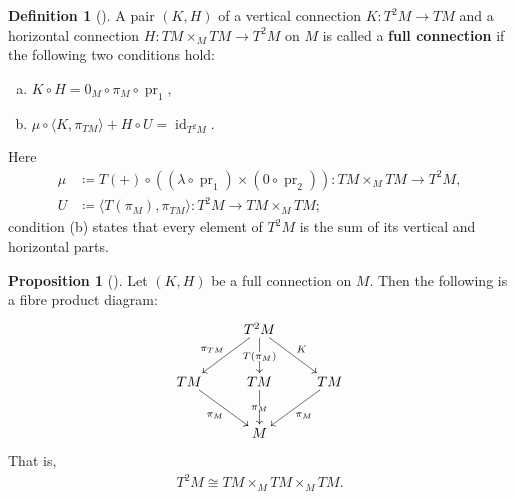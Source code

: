 \documentclass{amsart}
\DeclareMathOperator{\pr}{pr}
\DeclareMathOperator{\id}{id}
\theoremstyle{definition}
\newtheorem{defn}[thm]{Definition}
\newtheorem{prop}[thm]{Proposition}
\begin{document}
\begin{defn}[{\cite[Definition~5.2]{CC17}}]\label{def:full-connection}
A pair $(K, H)$ of a vertical connection $K \colon T^2M \to TM$ and a horizontal
connection $H \colon TM \times_M TM \to T^2M$ on $M$
is called a \textbf{full connection} if the
following two conditions hold:
\begin{enumerate}[(a)]
    \item $K \circ H = 0_M \circ \pi_M \circ \pr_1$,
    \item $\mu \circ \langle K, \pi_{TM} \rangle + H \circ U = \id_{T^2M}$.
\end{enumerate}
Here
\begin{align*}
  \mu &\coloneqq T({+}) \circ ((\lambda \circ \pr_1) \times (0 \circ \pr_2))
    \colon TM \times_M TM \to T^2M, \\
  U &\coloneqq \langle T(\pi_M), \pi_{TM} \rangle
    \colon T^2M \to TM \times_M TM;
\end{align*}
condition (b) states that every element of $T^2M$ is the sum of its
vertical and horizontal parts.
\end{defn}

\begin{prop}[{\cite[Proposition~5.8]{CC17}}]\label{prop:full-connection-fibre-product}
  Let $(K, H)$ be a full connection on $M$.
  Then the following is a fibre product diagram:
  \begin{equation}\label{eq:cx_ld}
\xymatrix{
            & T^2M \ar[dl]_{\pi_{TM}} \ar[d]|{T(\pi_M)} \ar[dr]^K & \\
TM \ar[dr]_{\pi_M} & TM \ar[d]|{\pi_M}                          & TM \ar[dl]^{\pi_M}\\
   & M                                                 &
}
\end{equation}
  That is,
  \begin{align*}
    T^2M \cong TM \times_M TM \times_M TM.
  \end{align*}
\end{prop}
\end{document}
